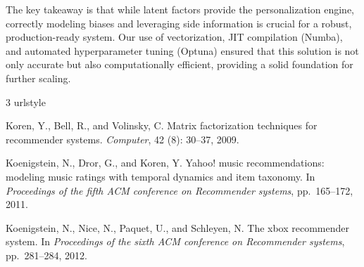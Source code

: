 \documentclass{article}
\theoremstyle{plain}
\theoremstyle{definition}
\theoremstyle{remark}
\begin{document}
The key takeaway is that while latent factors provide the personalization engine, correctly modeling biases and leveraging side information is crucial for a robust, production-ready system. Our use of vectorization, JIT compilation (Numba), and automated hyperparameter tuning (Optuna) ensured that this solution is not only accurate but also computationally efficient, providing a solid foundation for further scaling.





\begin{thebibliography}{3}
\providecommand{\natexlab}[1]{#1}
\providecommand{\url}[1]{\texttt{#1}}
\expandafter\ifx\csname urlstyle\endcsname\relax
  \providecommand{\doi}[1]{doi: #1}\else
  \providecommand{\doi}{doi: \begingroup \urlstyle{rm}\Url}\fi

Koren, Y., Bell, R., and Volinsky, C.
\newblock Matrix factorization techniques for recommender systems.
\newblock \emph{Computer}, 42 (8): 30--37, 2009.

Koenigstein, N., Dror, G., and Koren, Y.
\newblock Yahoo! music recommendations: modeling music ratings with temporal dynamics and item taxonomy.
\newblock In \emph{Proceedings of the fifth ACM conference on Recommender systems}, pp.\  165--172, 2011.

Koenigstein, N., Nice, N., Paquet, U., and Schleyen, N.
\newblock The xbox recommender system.
\newblock In \emph{Proceedings of the sixth ACM conference on Recommender systems}, pp.\  281--284, 2012.

\end{thebibliography}
\end{document}
